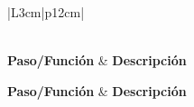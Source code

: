 \setlength{\tabcolsep}{10pt}
\renewcommand{\arraystretch}{1.5}
\begin{longtable}{|L{3cm}|p{12cm}|}
  \caption[Pasos del esquema SRTP]{Pasos del flujo del esquema SRTP y su descripción}
  \label{tab:srtp-steps-b} \\

  \hline
  \textbf{Paso/Función} & \textbf{Descripción} \\
  \hline
  \endfirsthead %

  \hline
  \textbf{Paso/Función} & \textbf{Descripción} \\
  \hline
  \endhead %

  \hline
   \\
  \hline
  \endfoot %

  \hline
   \\
  \hline
  \endlastfoot %


\end{longtable}
